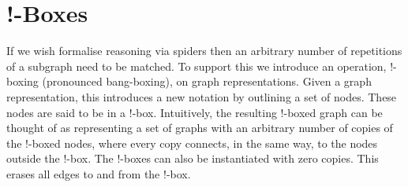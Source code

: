 \documentclass[runningheads]{llncs}
\newcommand{\vinterp}[1]{\llbracket #1 \rrbracket_v}
\begin{document}



\section{!-Boxes}

If we wish formalise reasoning via spiders then an arbitrary
number of repetitions of a subgraph need to be matched. To support
this we introduce an operation, !-boxing (pronounced bang-boxing), on
graph representations. Given a graph representation, this introduces a
new notation by outlining a set of nodes. These nodes are said to be
in a !-box. Intuitively, the resulting !-boxed graph can be thought of
as representing a set of graphs with an arbitrary number of copies of
the !-boxed nodes, where every copy connects, in the same way, to the
nodes outside the !-box. The !-boxes can also be instantiated with
zero copies. This erases all edges to and from the !-box. 


\end{document}
